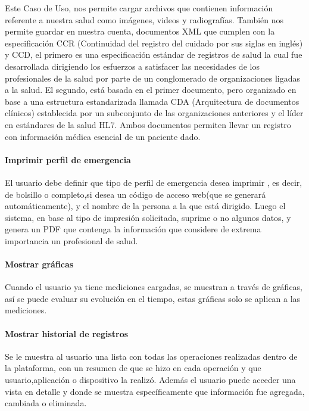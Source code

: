 Este Caso de Uso, nos permite cargar archivos que contienen información referente a nuestra salud como imágenes, videos y radiografías. También nos permite guardar en nuestra cuenta, documentos XML que cumplen con la especificación CCR (Continuidad del registro del cuidado por sus siglas en inglés) y CCD, el primero es una especificación estándar de registros de salud la cual fue desarrollada dirigiendo los esfuerzos a satisfacer las necesidades de los profesionales de la salud por parte de un conglomerado de organizaciones ligadas a la salud. El segundo, está basada  en el primer documento, pero organizado en base a una estructura estandarizada llamada CDA (Arquitectura de documentos clínicos) establecida por un subconjunto de las organizaciones anteriores y el líder en estándares de la salud HL7. Ambos documentos permiten llevar un registro con información médica esencial de un paciente dado.
    
\paragraph{Imprimir perfil de emergencia}

El usuario debe definir que tipo de perfil de emergencia desea imprimir , es decir, de bolsillo o completo,si desea un código de acceso web(que se generará automáticamente), y el nombre de la persona a la que está dirigido. Luego el sistema, en base al tipo de impresión solicitada, suprime o no algunos datos, y genera un PDF que contenga la información que considere de extrema importancia un profesional de salud.

\paragraph{Mostrar gráficas}

Cuando el usuario ya tiene mediciones cargadas, se muestran a través de gráficas, así se puede evaluar su evolución en el tiempo, estas gráficas solo se aplican a las mediciones.

\paragraph{Mostrar historial de registros}

Se le muestra al usuario una lista con todas las operaciones realizadas dentro de la plataforma, con un resumen de que se hizo en cada operación y que usuario,aplicación o dispositivo la realizó. Además el usuario puede acceder una vista en detalle y donde se muestra específicamente que información fue agregada, cambiada o eliminada.


